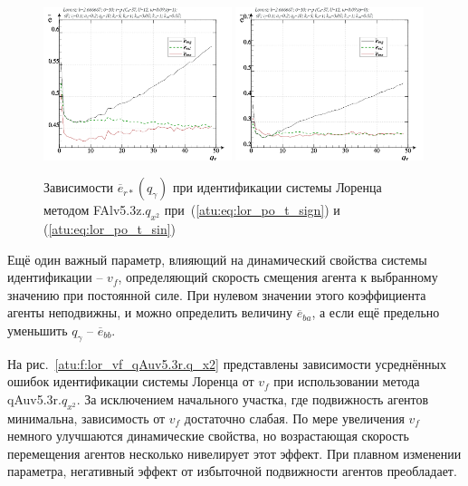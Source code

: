 \begin{figure}[h!]
  \centerline{
    \includegraphics[width=0.49\textwidth]{p/cha/lor/FAlv5.3z/lor_FAlv5_3z_qx2-p_qg_e_sign.png}
    \hfill
    \includegraphics[width=0.49\textwidth]{p/cha/lor/FAlv5.3z/lor_FAlv5_3z_qx2-p_qg_e_sin.png}
  }
  \caption{Зависимости $\overline{e}_{r*}(q_\gamma)$ при идентификации системы Лоренца методом FAlv5.3z.$q_{x^2}$
   при~(\ref{atu:eq:lor_po_t_sign}) и (\ref{atu:eq:lor_po_t_sin})}
  \label{atu:f:lor_qg_FAlv5.3z.q_x2}
\end{figure}


Ещё один важный параметр, влияющий на динамический свойства
системы идентификации -- $v_f$, определяющий скорость
смещения агента к выбранному значению при постоянной силе.
При нулевом значении этого коэффициента агенты неподвижны,
и можно определить величину $\overline{e}_{ba}$,
а если ещё предельно уменьшить $q_\gamma$ --  $\overline{e}_{bb}$.



На рис.~\ref{atu:f:lor_vf_qAuv5.3r.q_x2} представлены зависимости
усреднённых ошибок идентификации системы Лоренца от $v_f$ при использовании метода qAuv5.3r.$q_{x^2}$.
За исключением начального участка, где подвижность агентов
минимальна, зависимость от $v_f$ достаточно слабая.
По мере увеличения $v_f$ немного улучшаются динамические свойства,
но возрастающая скорость перемещения агентов
несколько нивелирует этот эффект. При плавном изменении параметра,
негативный эффект от избыточной подвижности агентов преобладает.

